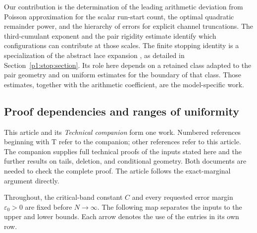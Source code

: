 Our contribution is the determination of the leading arithmetic
deviation from Poisson approximation for the scalar run-start
count, the optimal quadratic remainder power, and the
hierarchy of errors for explicit channel truncations.
The third-cumulant exponent and the pair rigidity estimate
identify which configurations can contribute at those scales.
The finite stopping identity is a specialization of the abstract
lace expansion \cite{zeilberger1997}, as detailed in
Section~\ref{p1:stop:section}.
Its role here depends on a retained class adapted to the pair
geometry and on uniform estimates for the boundary of that class.
Those estimates, together with the arithmetic coefficient, are
the model-specific work.

\subsection{Proof dependencies and ranges of uniformity}
\label{p1:intro:dependencies}

This article and its \emph{Technical companion} form one work.
Numbered references beginning with T refer to the companion;
other references refer to this article. The companion supplies
full technical proofs of the inputs stated here and the further
results on tails, deletion, and conditional geometry. Both
documents are needed to check the complete proof. The article
follows the exact-marginal argument directly.

Throughout, the critical-band constant \(C\) and every requested
error margin \(\varepsilon_0>0\) are fixed before \(N\to\infty\).
The following map separates the inputs to the upper and lower bounds.
Each arrow denotes the use of the entries in its own row.

